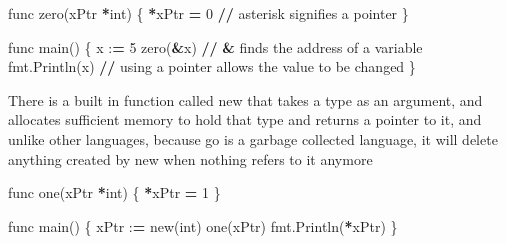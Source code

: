 \documentclass[]{book}
\newenvironment{Shaded}{\begin{snugshade}}{\end{snugshade}}
\newcommand{\DecValTok}[1]{\textcolor[rgb]{0.00,0.00,0.81}{#1}}
\newcommand{\OperatorTok}[1]{\textcolor[rgb]{0.81,0.36,0.00}{\textbf{#1}}}
\newcommand{\BuiltInTok}[1]{#1}
\newcommand{\NormalTok}[1]{#1}
\begin{document}
\begin{Shaded}
\begin{Highlighting}[]
\NormalTok{func zero(xPtr }\OperatorTok{*}\BuiltInTok{int}\NormalTok{) \{                                              }
    \OperatorTok{*}\NormalTok{xPtr }\OperatorTok{=} \DecValTok{0} \OperatorTok{//}\NormalTok{ asterisk signifies a pointer                                                       }
\NormalTok{\}                                                                   }
                                                                    
\NormalTok{func main() \{                                                       }
\NormalTok{    x :}\OperatorTok{=} \DecValTok{5}                                                          
\NormalTok{    zero(}\OperatorTok{&}\NormalTok{x) }\OperatorTok{//} \OperatorTok{&}\NormalTok{ finds the address of a variable                                                       }
\NormalTok{    fmt.Println(x) }\OperatorTok{//}\NormalTok{ using a pointer allows the value to be changed}
\NormalTok{\}                                                                   }
\end{Highlighting}
\end{Shaded}

There is a built in function called new that takes a type as an
argument, and allocates sufficient memory to hold that type and returns
a pointer to it, and unlike other languages, because go is a garbage
collected language, it will delete anything created by new when nothing
refers to it anymore

\begin{Shaded}
\begin{Highlighting}[]
\NormalTok{func one(xPtr }\OperatorTok{*}\BuiltInTok{int}\NormalTok{) \{}
    \OperatorTok{*}\NormalTok{xPtr }\OperatorTok{=} \DecValTok{1}        
\NormalTok{\}}
                    
\NormalTok{func main() \{                                                                                                                 }
\NormalTok{    xPtr :}\OperatorTok{=}\NormalTok{ new(}\BuiltInTok{int}\NormalTok{)                                                }
\NormalTok{    one(xPtr)                                                       }
\NormalTok{    fmt.Println(}\OperatorTok{*}\NormalTok{xPtr)                                              }
\NormalTok{\}                                                                   }
\end{Highlighting}
\end{Shaded}
\end{document}
